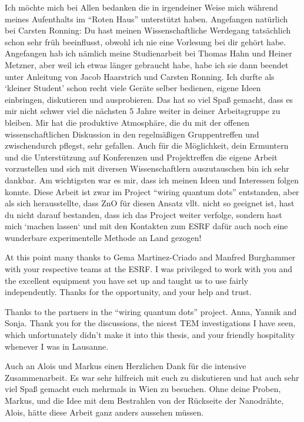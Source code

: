 \begin{appendices}
Ich möchte mich bei Allen bedanken die in irgendeiner Weise mich während meines Aufenthalts im ``Roten Haus'' unterstützt haben. Angefangen natürlich bei Carsten Ronning: Du hast meinen Wissenschaftliche Werdegang tatsächlich schon sehr früh beeinflusst, obwohl ich nie eine Vorlesung bei dir gehört habe. Angefangen hab ich nämlich meine Studienarbeit bei Thomas Hahn und Heiner Metzner, aber weil ich etwas länger gebraucht habe, habe ich sie dann beendet unter Anleitung von Jacob Haarstrich und Carsten Ronning. Ich durfte als `kleiner Student' schon recht viele Geräte selber bedienen, eigene Ideen einbringen, diskutieren und ausprobieren. Das hat so viel Spaß gemacht, dass es mir nicht schwer viel die nächsten 5 Jahre weiter in deiner Arbeitsgruppe zu bleiben. Mir hat die produktive Atmosphäre, die du mit der offenen wissenschaftlichen Diskussion in den regelmäßigen Gruppentreffen und zwischendurch pflegst, sehr gefallen. Auch für die Möglichkeit, dein Ermuntern und die Unterstützung auf Konferenzen und Projektreffen die eigene Arbeit vorzustellen und sich mit diversen Wissenschaftlern auszutauschen bin ich sehr dankbar. Am wichtigsten war es mir, dass ich meinen Ideen und Interessen folgen konnte. Diese Arbeit ist zwar im Project ``wiring quantum dots'' entstanden, aber als sich herausstellte, dass ZnO für diesen Ansatz vllt. nicht so geeignet ist, hast du nicht darauf bestanden, dass ich das Project weiter verfolge, sondern hast mich `machen lassen‘ und mit den Kontakten zum ESRF dafür auch noch eine wunderbare experimentelle Methode an Land gezogen!

At this point many thanks to Gema Martinez-Criado and Manfred Burghammer with your respective teams at the ESRF. I was privileged to work with you and the excellent equipment you have set up and taught us to use fairly independently. Thanks for the opportunity, and your help and trust.

Thanks to the partners in the “wiring quantum dots” project. Anna, Yannik and Sonja. Thank you for the discussions, the nicest TEM investigations I have seen, which unfortunately didn’t make it into this thesis, and your friendly hospitality whenever I was in Lausanne. 

Auch an Alois und Markus einen Herzlichen Dank für die intensive Zusammenarbeit. Es war sehr hilfreich mit euch zu diskutieren und hat auch sehr viel Spaß gemacht euch mehrmals in Wien zu besuchen. Ohne deine Proben, Markus, und die Idee mit dem Bestrahlen von der Rückseite der Nanodrähte, Alois, hätte diese Arbeit ganz anders aussehen müssen.


\end{appendices}
